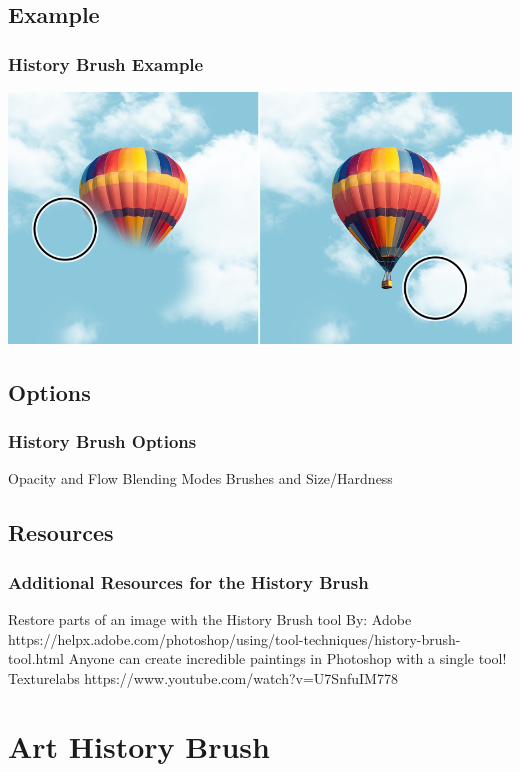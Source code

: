\documentclass{beamer}
\begin{document}
\subsection{Example}		
\begin{frame}
	\frametitle{History Brush Example}
	\begin{center}
		\includegraphics[width=1.0\textwidth]{images/history brush tool.png}
	\end{center}
\end{frame}

\subsection{Options}		
\begin{frame}
	\frametitle{History Brush Options}
	\begin{outline}
		\1 Opacity and Flow
		\1 Blending Modes
		\1 Brushes and Size/Hardness
	\end{outline}
\end{frame}

\subsection{Resources}		
\begin{frame}
	\frametitle{Additional Resources for the History Brush}
	\begin{outline}
			\1 Restore parts of an image with the History Brush tool
			\2 By:  Adobe
			\2 https://helpx.adobe.com/photoshop/using/tool-techniques/history-brush-tool.html
			\1 Anyone can create incredible paintings in Photoshop with a single tool!
			\2 Texturelabs
			\2 https://www.youtube.com/watch?v=U7SnfuIM778
	\end{outline}
\end{frame}


\section{Art History Brush}
\end{document}
